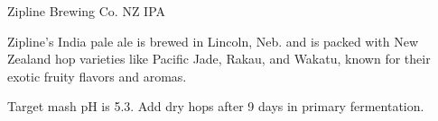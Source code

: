 \begin{recipie}{Zipline Brewing Co. NZ IPA}

\begin{aboutblock}
Zipline's India pale ale is brewed in Lincoln, Neb. and is packed with New Zealand hop
varieties like Pacific Jade, Rakau, and Wakatu, known for their exotic fruity flavors and
aromas.
\end{aboutblock}


\begin{methodandtiming}
 
\begin{mashsteps}
\end{mashsteps}

\begin{directions}
Target mash pH is 5.3. Add dry hops after 9 days in primary fermentation.
\end{directions}

\end{methodandtiming}

\pagebreak

\begin{ingredientsblock}

\begin{malts}
\end{malts}

\begin{hops}
\end{hops}

\begin{yeasts}
\end{yeasts}

\end{ingredientsblock}

\end{recipie}